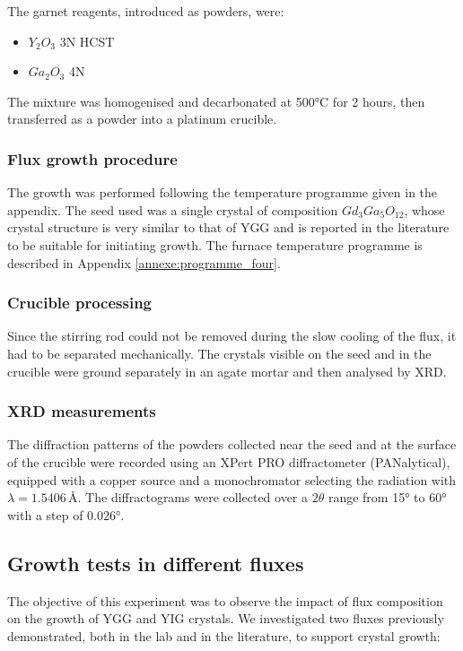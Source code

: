 \documentclass{rapportENSCP}
\begin{document}
The garnet reagents, introduced as powders, were:
\begin{itemize}
    \item $Y_2O_3$ 3N HCST
    \item $Ga_2O_3$ 4N
\end{itemize}

The mixture was homogenised and decarbonated at 500°C for 2 hours, then transferred as a powder into a platinum crucible.

\subsubsection{Flux growth procedure}
The growth was performed following the temperature programme given in the appendix. The seed used was a single crystal of composition $Gd_3Ga_5O_{12}$, whose crystal structure is very similar to that of YGG and is reported in the literature to be suitable for initiating growth. The furnace temperature programme is described in Appendix \ref{annexe:programme_four}.

\subsubsection{Crucible processing}
Since the stirring rod could not be removed during the slow cooling of the flux, it had to be separated mechanically. The crystals visible on the seed and in the crucible were ground separately in an agate mortar and then analysed by XRD.

\subsubsection{XRD measurements}
The diffraction patterns of the powders collected near the seed and at the surface of the crucible were recorded using an XPert PRO diffractometer (PANalytical), equipped with a copper source and a monochromator selecting the radiation with $\lambda = 1.5406$\,Å. The diffractograms were collected over a $2\theta$ range from 15° to 60° with a step of 0.026°.

\subsection{Growth tests in different fluxes}
The objective of this experiment was to observe the impact of flux composition on the growth of YGG and YIG crystals. We investigated two fluxes previously demonstrated, both in the lab and in the literature, to support crystal growth:
\end{document}
